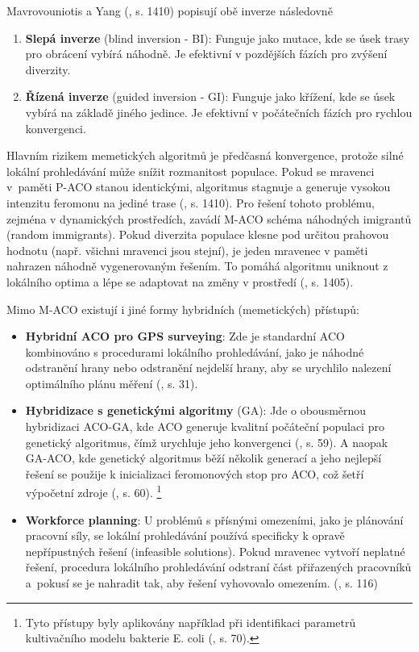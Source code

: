 \documentclass[a4paper, twoside, 12pt, czech]{article}
\begin{document}
Mavrovouniotis a Yang (\cite{dynamic-aco}, s. 1410) popisují obě inverze následovně
\begin{enumerate}
    \item \textbf{Slepá inverze} (blind inversion - BI): Funguje jako mutace, kde se úsek trasy 
    pro obrácení vybírá náhodně. Je efektivní v pozdějších fázích pro zvýšení 
    diverzity.
    \item \textbf{Řízená inverze} (guided inversion - GI): Funguje jako křížení, kde se úsek 
    vybírá na základě jiného jedince. Je efektivní v počátečních fázích pro rychlou 
    konvergenci.
\end{enumerate}

Hlavním rizikem memetických algoritmů je předčasná konvergence, protože silné 
lokální prohledávání může snížit rozmanitost populace. Pokud se 
mravenci v~paměti P-ACO stanou identickými, algoritmus stagnuje a generuje 
vysokou intenzitu feromonu na jediné trase (\cite{dynamic-aco}, s. 1410). Pro řešení tohoto problému, 
zejména v dynamických prostředích, zavádí M-ACO schéma náhodných imigran\-tů 
(random immigrants). Pokud diverzita populace klesne pod určitou prahovou 
hodnotu (např. všichni mravenci jsou stejní), je jeden mravenec v paměti 
nahrazen náhodně vygenerovaným řešením. To pomáhá algoritmu uniknout z lokálního 
optima a lépe se adaptovat na změny v prostředí (\cite{dynamic-aco}, s. 1405).

Mimo M-ACO existují i jiné formy hybridních (memetických) přístupů:
\begin{itemize}
    \item \textbf{Hybridní ACO pro GPS surveying}: Zde je standardní ACO kombinováno s 
    procedurami lokálního prohledávání, jako je náhodné odstranění hrany nebo 
    odstranění nejdelší hrany, aby se urychlilo nalezení optimálního plánu měření (\cite{Fidanova2021-qg}, s. 31).
    \item \textbf{Hybridizace s genetickými algoritmy} (GA): Jde o obousměrnou hybridizaci 
    ACO-GA, kde ACO generuje kvalitní počáteční populaci pro genetický algoritmus, 
    čímž urychluje jeho konvergenci (\cite{Fidanova2021-qg}, s. 59). A naopak GA-ACO, kde genetický algoritmus 
    běží několik generací a jeho nejlepší řešení se použije k inicializaci 
    feromonových stop pro ACO, což šetří výpočetní zdroje (\cite{Fidanova2021-qg}, s. 60). 
    \footnote{Tyto přístupy byly aplikovány například při identifikaci parametrů kultivačního modelu bakterie E. coli (\cite{Fidanova2021-qg}, s. 70).}
    \item \textbf{Workforce planning}: U problémů s přísnými omezeními, jako je plánování 
    pracovní síly, se lokální prohledávání používá specificky k opravě 
    nepřípust\-ných řešení (infeasible solutions). Pokud mravenec vytvoří neplatné 
    řešení, procedura lokálního prohledávání odstraní část přiřazených pracovníků 
    a~pokusí se je nahradit tak, aby řešení vyhovovalo omezením. (\cite{Fidanova2021-qg}, s. 116)
\end{itemize}
\end{document}
